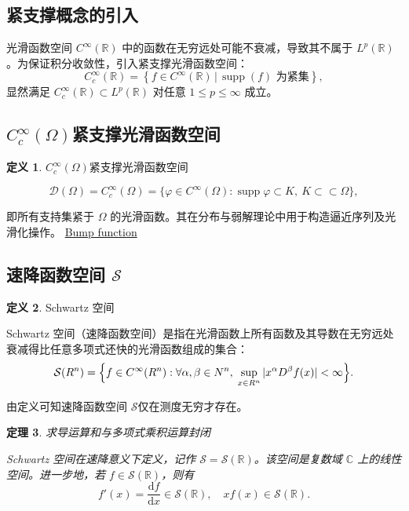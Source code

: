\documentclass[12pt,a4paper]{article}
\newcommand{\R}{\mathbb{R}}                %
\newcommand{\N}{\mathbb{N}}                %
\DeclareMathOperator{\supp}{supp}          %
\def\R{R}%
\def\N{N}%
\theoremstyle{plain}
\newtheorem{theorem}{定理}[section]
\theoremstyle{definition}
\newtheorem{definition}[theorem]{定义}
\theoremstyle{remark}
\begin{document}
	
	\subsection{紧支撑概念的引入}
	光滑函数空间 $C^\infty(\mathbb{R})$ 中的函数在无穷远处可能不衰减，导致其不属于 $L^p(\mathbb{R})$。为保证积分收敛性，引入紧支撑光滑函数空间：
	\[
	C_c^\infty(\mathbb{R}) = \left\{ f \in C^\infty(\mathbb{R}) \,\big|\, \supp(f) \text{ 为紧集} \right\},
	\]
	显然满足 $C_c^\infty(\mathbb{R}) \subset L^p(\mathbb{R})$ 对任意 $1 \leq p \leq \infty$ 成立。
	\subsection{\texorpdfstring{$C_c^\infty(\Omega)$}{Cc∞}紧支撑光滑函数空间}
	
	\begin{definition}$C_c^\infty(\Omega)$紧支撑光滑函数空间

		\[
		\mathcal D(\Omega)=	C_c^\infty(\Omega)
		=\{\varphi\in C^\infty(\Omega):\supp\varphi\subset K,\ K\subset\subset\Omega\},
		\]
		
		
		即所有支持集紧于 $\Omega$ 的光滑函数。其在分布与弱解理论中用于构造逼近序列及光滑化操作。
		\href{https://en.wikipedia.org/wiki/Bump_function}{Bump function}
	\end{definition}
	
	\subsection{速降函数空间 $\mathcal S$}
	
	\begin{definition}Schwartz 空间
		
		Schwartz 空间（速降函数空间）是指在光滑函数上所有函数及其导数在无穷远处衰减得比任意多项式还快的光滑函数组成的集合：
		\[
		\mathcal S(\R^n)
		=\Bigl\{f\in C^\infty(\R^n):
		\forall\alpha,\beta\in\N^n,\;\sup_{x\in\R^n}|x^\alpha D^\beta f(x)|<\infty\Bigr\}.
		\]
	\end{definition}
	
	由定义可知速降函数空间 $\mathcal S$仅在测度无穷才存在。
	
	  \begin{theorem}求导运算和与多项式乘积运算封闭
		
			Schwartz 空间在速降意义下定义，记作 \( \mathcal{S} = \mathcal{S}(\mathbb{R}) \)。该空间是复数域 \( \mathbb{C} \) 上的线性空间。进一步地，若 \( f \in \mathcal{S}(\mathbb{R}) \)，则有
		\[
		f'(x) = \frac{\mathrm{d}f}{\mathrm{d}x} \in \mathcal{S}(\mathbb{R}), \quad xf(x) \in \mathcal{S}(\mathbb{R}).
		\]
	\end{theorem}
	
\end{document}
